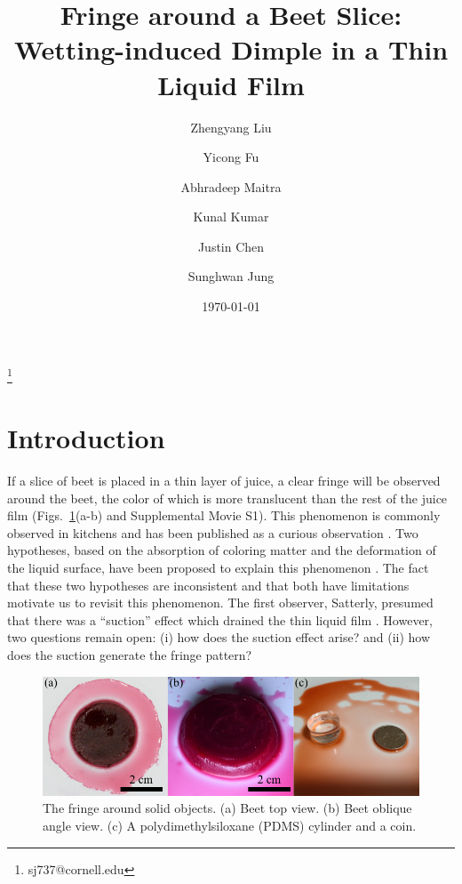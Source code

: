 \documentclass[aps,prfluids,amsmath,amssymb,superscriptaddress,longbibliography]{revtex4-2}
\date{\today}
\begin{document}
\title{Fringe around a Beet Slice: Wetting-induced Dimple in a Thin Liquid Film}

\author{Zhengyang Liu}
\author{Yicong Fu}
\author{Abhradeep Maitra}
\author{Kunal Kumar}
\author{Justin Chen}
\author{Sunghwan Jung} \thanks{sj737@cornell.edu}

\maketitle

\section{Introduction}

If a slice of beet is placed in a thin layer of juice, a clear fringe will be observed around the beet, the color of which is more translucent than the rest of the juice film (Figs.~\ref{fig:beet-fringe-observation}(a-b) and Supplemental Movie S1). 
This phenomenon is commonly observed in kitchens and has been published as a curious observation \cite{Satterly1956}. 
Two hypotheses, based on the absorption of coloring matter and the deformation of the liquid surface, have been proposed to explain this phenomenon \cite{Satterly1956,Scott1982}. 
The fact that these two hypotheses are inconsistent and that both have limitations motivate us to revisit this phenomenon. 
The first observer, Satterly, presumed that there was a ``suction'' effect which drained the thin liquid film \cite{Satterly1956}. 
However, two questions remain open: (i) how does the suction effect arise? and (ii) how does the suction generate the fringe pattern?

\begin{figure}
    \centering
    \includegraphics[width=.8\linewidth]{beet_fringe_observation}
    \caption{
    The fringe around solid objects.
    (a) Beet top view.
    (b) Beet oblique angle view.
    (c) A polydimethylsiloxane (PDMS) cylinder and a coin.
    }
    \label{fig:beet-fringe-observation}
\end{figure}
\end{document}

